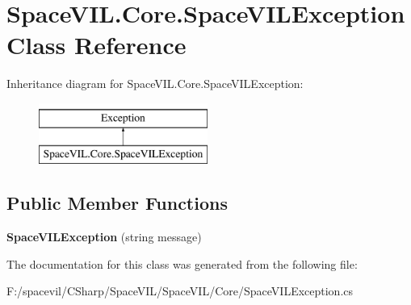 \hypertarget{class_space_v_i_l_1_1_core_1_1_space_v_i_l_exception}{}\section{Space\+V\+I\+L.\+Core.\+Space\+V\+I\+L\+Exception Class Reference}
\label{class_space_v_i_l_1_1_core_1_1_space_v_i_l_exception}
Inheritance diagram for Space\+V\+I\+L.\+Core.\+Space\+V\+I\+L\+Exception\+:\begin{figure}[H]
\begin{center}
\leavevmode
\includegraphics[height=2.000000cm]{class_space_v_i_l_1_1_core_1_1_space_v_i_l_exception}
\end{center}
\end{figure}
\subsection*{Public Member Functions}
\begin{DoxyCompactItemize}
\item 
\mbox{\label{class_space_v_i_l_1_1_core_1_1_space_v_i_l_exception_a72d073e6629374861f5afe9d3c446ad0}} 
{\bfseries Space\+V\+I\+L\+Exception} (string message)
\end{DoxyCompactItemize}


The documentation for this class was generated from the following file\+:\begin{DoxyCompactItemize}
\item 
F\+:/spacevil/\+C\+Sharp/\+Space\+V\+I\+L/\+Space\+V\+I\+L/\+Core/Space\+V\+I\+L\+Exception.\+cs\end{DoxyCompactItemize}
